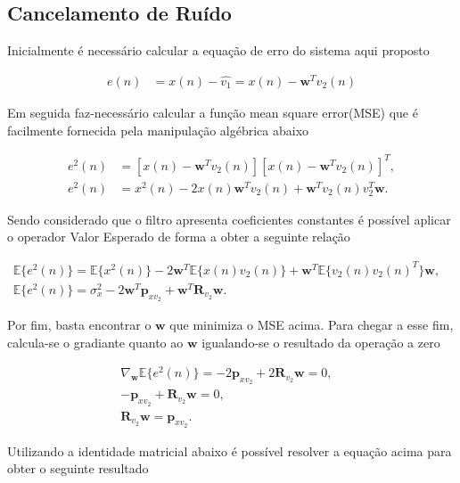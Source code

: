 \subsection{Cancelamento de Ruído} %

Inicialmente é necessário calcular a equação de erro do sistema aqui proposto

\begin{align}
    e(n) &= x(n) - \hat{v_{1}} = x(n) - \mathbf{w}^{T}v_{2}(n)
\end{align}

Em seguida faz-necessário calcular a função mean square error(MSE) que é facilmente fornecida pela manipulação algébrica abaixo

\begin{align}
    e^{2}(n) &= [x(n) - \mathbf{w}^{T}v_{2}(n)][x(n) - \mathbf{w}^{T}v_{2}(n)]^{T}, \\
    e^{2}(n) &= x^{2}(n) - 2x(n)\mathbf{w}^{T}v_{2}(n) + \mathbf{w}^{T}v_{2}(n)v_{2}^{T}\mathbf{w}.
\end{align}

Sendo considerado que o filtro apresenta coeficientes constantes é possível aplicar o operador Valor Esperado de forma a obter a seguinte relação

\begin{align}
    \mathbb{E}\{e^{2}(n)\} = \mathbb{E}\{x^{2}(n)\} - 2\mathbf{w}^{T}\mathbb{E}\{x(n) v_{2}(n)\} + \mathbf{w}^{T}\mathbb{E}\{v_{2}(n)v_{2}(n)^{T}\} \mathbf{w},& \\
    \mathbb{E}\{e^{2}(n)\} = \sigma^{2}_{x} - 2\mathbf{w}^{T}\mathbf{p}_{xv_{2}} + \mathbf{w}^{T}\mathbf{R}_{v_{2}} \mathbf{w}.&
\end{align}

Por fim, basta encontrar o $\mathbf{w}$ que minimiza o MSE acima. Para chegar a esse fim, calcula-se o gradiante quanto ao $\mathbf{w}$ igualando-se o resultado da operação a zero

\begin{align}
    \nabla_{\mathbf{w}} \mathbb{E}\{e^{2}(n)\} = - 2\mathbf{p}_{xv_{2}} + 2\mathbf{R}_{v_{2}} \mathbf{w} = 0,& \\
    -\mathbf{p}_{xv_{2}} + \mathbf{R}_{v_{2}} \mathbf{w} = 0,& \\
    \mathbf{R}_{v_{2}} \mathbf{w} = \mathbf{p}_{xv_{2}}.&
\end{align}

Utilizando a identidade matricial abaixo é possível resolver a equação acima para obter o seguinte resultado

